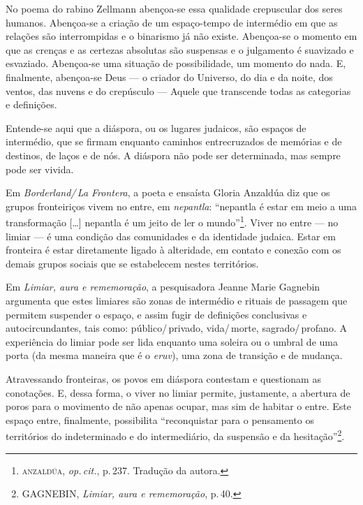 No poema do rabino Zellmann abençoa-se essa qualidade crepuscular dos
seres humanos. Abençoa-se a criação de um espaço-tempo de intermédio em
que as relações são interrompidas e o binarismo já não existe.
Abençoa-se o momento em que as crenças e as certezas absolutas são
suspensas e o julgamento é suavizado e esvaziado. Abençoa-se uma
situação de possibilidade, um momento do nada. E, finalmente, abençoa-se
Deus --- o criador do Universo, do dia e da noite, dos ventos, das
nuvens e do crepúsculo --- Aquele que transcende todas as categorias e
definições.

Entende-se aqui que a diáspora, ou os lugares judaicos, são espaços de
intermédio, que se firmam enquanto caminhos entrecruzados de memórias e
de destinos, de laços e de nós. A diáspora não pode ser determinada, mas
sempre pode ser vivida.

\begin{center}\end{center}

\noindent{}Em \emph{Borderland/\,La Frontera}, a poeta e ensaísta Gloria Anzaldúa diz
que os grupos fronteiriços vivem no entre, em \emph{nepantla}:
``nepantla é estar em meio a uma transformação {[}\ldots{}{]} nepantla
é um jeito de ler o mundo''\footnote{\textsc{anzaldúa}, \emph{op.\,cit.}, p.\,237. Tradução da autora.}. Viver no entre --- no limiar --- é uma condição das
comunidades e da identidade judaica. Estar em fronteira é estar
diretamente ligado à alteridade, em contato e conexão com os demais
grupos sociais que se estabelecem nestes territórios.

Em \emph{Limiar, aura e rememoração}, a pesquisadora Jeanne Marie
Gagnebin argumenta que estes limiares são zonas de intermédio e rituais
de passagem que permitem suspender o espaço, e assim fugir de definições
conclusivas e autocircundantes, tais como: público/\,privado, vida/\,morte,
sagrado/\,profano. A experiência do limiar pode ser lida enquanto uma
soleira ou o umbral de uma porta (da mesma maneira que é o \emph{eruv}),
uma zona de transição e de mudança.

Atravessando fronteiras, os povos em diáspora contestam e questionam as
conotações. E, dessa forma, o viver no limiar permite, justamente, a
abertura de poros para o movimento de não apenas ocupar, mas sim de
habitar o entre. Este espaço entre, finalmente, possibilita
``reconquistar para o pensamento os territórios do indeterminado e
do intermediário, da suspensão e da hesitação''\footnote{GAGNEBIN,
  \emph{Limiar, aura e rememoração}, p.\,40.}.

